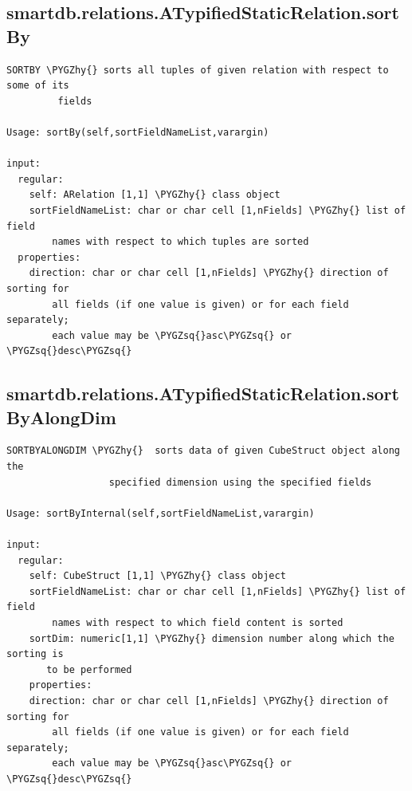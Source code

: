\documentclass[letterpaper,10pt,english]{sphinxmanual}
\def\PYGZhy{\char`\-}
\def\PYGZsq{\char`\'}
\begin{document}
\subsection{smartdb.relations.ATypifiedStaticRelation.sortBy}
\label{chap_functions:smartdb-relations-atypifiedstaticrelation-sortby}
\begin{Verbatim}[commandchars=\\\{\}]
SORTBY \PYGZhy{} sorts all tuples of given relation with respect to some of its
         fields

Usage: sortBy(self,sortFieldNameList,varargin)

input:
  regular:
    self: ARelation [1,1] \PYGZhy{} class object
    sortFieldNameList: char or char cell [1,nFields] \PYGZhy{} list of field
        names with respect to which tuples are sorted
  properties:
    direction: char or char cell [1,nFields] \PYGZhy{} direction of sorting for
        all fields (if one value is given) or for each field separately;
        each value may be \PYGZsq{}asc\PYGZsq{} or \PYGZsq{}desc\PYGZsq{}
\end{Verbatim}


\subsection{smartdb.relations.ATypifiedStaticRelation.sortByAlongDim}
\label{chap_functions:smartdb-relations-atypifiedstaticrelation-sortbyalongdim}
\begin{Verbatim}[commandchars=\\\{\}]
SORTBYALONGDIM \PYGZhy{}  sorts data of given CubeStruct object along the
                  specified dimension using the specified fields

Usage: sortByInternal(self,sortFieldNameList,varargin)

input:
  regular:
    self: CubeStruct [1,1] \PYGZhy{} class object
    sortFieldNameList: char or char cell [1,nFields] \PYGZhy{} list of field
        names with respect to which field content is sorted
    sortDim: numeric[1,1] \PYGZhy{} dimension number along which the sorting is
       to be performed
    properties:
    direction: char or char cell [1,nFields] \PYGZhy{} direction of sorting for
        all fields (if one value is given) or for each field separately;
        each value may be \PYGZsq{}asc\PYGZsq{} or \PYGZsq{}desc\PYGZsq{}
\end{Verbatim}
\end{document}
